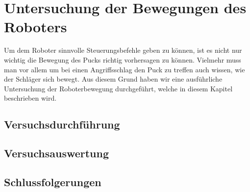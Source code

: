 
\chapter{Untersuchung der Bewegungen des Roboters}
Um dem Roboter sinnvolle Steuerungsbefehle geben zu können, ist es nicht nur wichtig die Bewegung des Pucks richtig vorhersagen zu können. Vielmehr muss man vor allem um bei einen Angriffsschlag den Puck zu treffen auch wissen, wie der Schläger sich bewegt. Aus diesem Grund haben wir eine ausführliche Untersuchung der Roboterbewegung durchgeführt, welche in diesem Kapitel beschrieben wird.

\section{Versuchsdurchführung}

\section{Versuchsauswertung}

\section{Schlussfolgerungen}